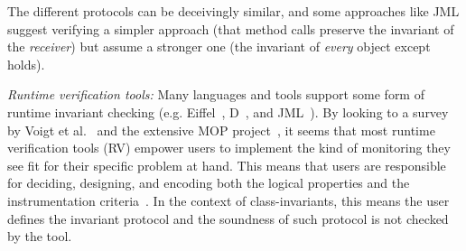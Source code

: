 The different protocols can be deceivingly similar, and 
some approaches like JML suggest verifying a simpler approach (that method calls preserve the invariant of the \emph{receiver}) but assume a stronger one (the invariant of \emph{every} object except \Q@this@ holds).






\newcommand\sepItems{\saveSpace\saveSpace\saveSpace\\*${}_{}$\\*${}_{}\,\bullet\,$}

\textit{Runtime verification tools:}
Many languages and tools support some form of runtime invariant checking (e.g. Eiffel~\cite{Meyer:1992:EL:129093}, D~\cite{Alexandrescu:2010:DPL:1875434},
and JML~\cite{Burdy2005}).
By looking to a survey by Voigt et al.~\cite{Voigt2013} and the extensive MOP project~\cite{meredith2012overview},
it seems that most runtime verification tools (RV) empower users
to implement the kind of monitoring they see fit for their specific problem at hand. This means that users are responsible for deciding, designing, and encoding both the logical properties and the instrumentation criteria~\cite{meredith2012overview}.
In the context of class-invariants, this means the user defines the invariant protocol and the soundness of such protocol is not checked by the tool.


